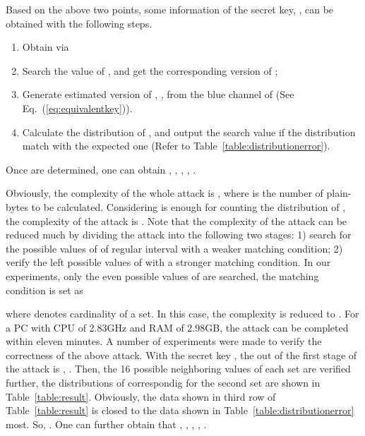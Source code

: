 \documentclass[twocolumn]{svjour3}
\begin{document}
Based on the above two points, some information of the secret key, , can be obtained with the following steps.
\begin{enumerate}
\item Obtain  via


\item Search the value of , and get the corresponding version of ;

\item Generate estimated version of ,
, from the blue channel of
 (See Eq.~(\ref{eq:equivalentkey})).

\item Calculate the distribution of , and output the search value if the distribution match with the expected one (Refer to Table~\ref{table:distributionerror}).
\end{enumerate}

Once  are determined, one can obtain , , , 
, .

Obviously, the complexity of the whole attack is , where  is the number of plain-bytes to be calculated.
Considering  is enough for counting the distribution of , the complexity of the attack is . Note that the complexity of
the attack can be reduced much by dividing the attack into the following two stages: 1) search for the possible values of  of regular interval with a weaker matching condition;
2) verify the left possible values of  with a stronger matching condition. In our experiments, only the even possible values of 
are searched, the matching condition is set as

where  denotes cardinality of a set.
In this case, the complexity is reduced to . For a PC with CPU of 2.83GHz and RAM of 2.98GB, the attack can be
completed within eleven minutes. A number of experiments were made to verify the correctness of the
above attack. With the secret key    , the out of the first stage of the attack is , . Then, the 16 possible neighboring values of each
set are verified further, the distributions of  correspondig for the second set are shown in Table~\ref{table:result}. Obviously, the
data shown in third row of Table~\ref{table:result} is closed to the data shown in Table~\ref{table:distributionerror} most. So,  .
One can further obtain that , , , , .
\end{document}
